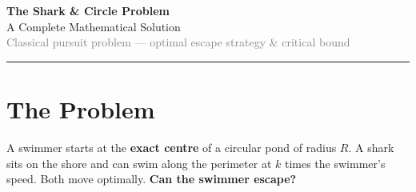 \documentclass[12pt, a4paper]{article}
\theoremstyle{definition}
\begin{document}
\begin{center}
  {\LARGE \textbf{The Shark \& Circle Problem}}\\[0.5em]
  {\large A Complete Mathematical Solution}\\[0.3em]
  {\small \textcolor{gray}{Classical pursuit problem — optimal escape strategy \& critical bound}}
  \vspace{0.4em}
  \hrule
\end{center}

\vspace{0.5em}

\section{The Problem}

\begin{notebox}
A swimmer starts at the \textbf{exact centre} of a circular pond of radius $R$.
A shark sits on the shore and can swim along the perimeter at $k$ times the swimmer's
speed. Both move optimally. \textbf{Can the swimmer escape?}
\end{notebox}

\vspace{1em}
\end{document}
